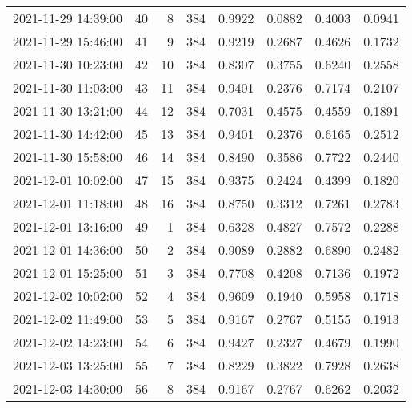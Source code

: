 \begin{table}
\begin{tabular}{lrrrrrrr}
2021-11-29 14:39:00 &   40 &    8 &    384 &   0.9922 & 0.0882 & 0.4003 & 0.0941 \\
2021-11-29 15:46:00 &   41 &    9 &    384 &   0.9219 & 0.2687 & 0.4626 & 0.1732 \\
2021-11-30 10:23:00 &   42 &   10 &    384 &   0.8307 & 0.3755 & 0.6240 & 0.2558 \\
2021-11-30 11:03:00 &   43 &   11 &    384 &   0.9401 & 0.2376 & 0.7174 & 0.2107 \\
2021-11-30 13:21:00 &   44 &   12 &    384 &   0.7031 & 0.4575 & 0.4559 & 0.1891 \\
2021-11-30 14:42:00 &   45 &   13 &    384 &   0.9401 & 0.2376 & 0.6165 & 0.2512 \\
2021-11-30 15:58:00 &   46 &   14 &    384 &   0.8490 & 0.3586 & 0.7722 & 0.2440 \\
2021-12-01 10:02:00 &   47 &   15 &    384 &   0.9375 & 0.2424 & 0.4399 & 0.1820 \\
2021-12-01 11:18:00 &   48 &   16 &    384 &   0.8750 & 0.3312 & 0.7261 & 0.2783 \\
2021-12-01 13:16:00 &   49 &    1 &    384 &   0.6328 & 0.4827 & 0.7572 & 0.2288 \\
2021-12-01 14:36:00 &   50 &    2 &    384 &   0.9089 & 0.2882 & 0.6890 & 0.2482 \\
2021-12-01 15:25:00 &   51 &    3 &    384 &   0.7708 & 0.4208 & 0.7136 & 0.1972 \\
2021-12-02 10:02:00 &   52 &    4 &    384 &   0.9609 & 0.1940 & 0.5958 & 0.1718 \\
2021-12-02 11:49:00 &   53 &    5 &    384 &   0.9167 & 0.2767 & 0.5155 & 0.1913 \\
2021-12-02 14:23:00 &   54 &    6 &    384 &   0.9427 & 0.2327 & 0.4679 & 0.1990 \\
2021-12-03 13:25:00 &   55 &    7 &    384 &   0.8229 & 0.3822 & 0.7928 & 0.2638 \\
2021-12-03 14:30:00 &   56 &    8 &    384 &   0.9167 & 0.2767 & 0.6262 & 0.2032 \\
\bottomrule
\end{tabular}
\end{table}
